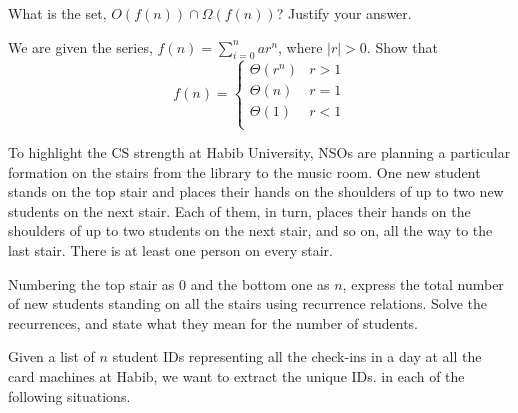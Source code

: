 \documentclass[addpoints]{exam}
\begin{document}
\begin{questions}
  \begin{solution}
    \begin{parts}
      \part 
      \part 
    \end{parts}
  \end{solution}
  
  \question[5] What is the set, $O(f(n)) \cap \Omega(f(n))$? Justify your answer.
  
  \begin{solution}
  \end{solution}
  
  \question[5] We are given the series, $f(n) = \sum_{i=0}^nar^n$, where $|r|>0$. Show that
  \[
    f(n) =
    \begin{cases}
      \Theta(r^n) & r > 1\\
      \Theta(n) & r = 1\\
      \Theta(1) & r < 1\\
    \end{cases}
  \]
  
  \begin{solution}
  \end{solution}

  \question[5] To highlight the CS strength at Habib University, NSOs are planning a particular formation on the stairs from the library to the music room. One new student stands on the top stair and places their hands on the shoulders of up to two new students on the next stair. Each of them, in turn, places their hands on the shoulders of up to two students on the next stair, and so on, all the way to the last stair. There is at least one person on every stair.

  Numbering the top stair as $0$ and the bottom one as $n$, express the total number of new students standing on all the stairs using recurrence relations. Solve the recurrences, and state what they mean for the number of students.
  
  \begin{solution}
  \end{solution}
  
  \question Given a list of $n$ student IDs representing all the check-ins in a day at all the card machines at Habib, we want to extract the unique IDs. in each of the following situations. 
  \begin{parts}

\end{parts}
\end{questions}
\end{document}
